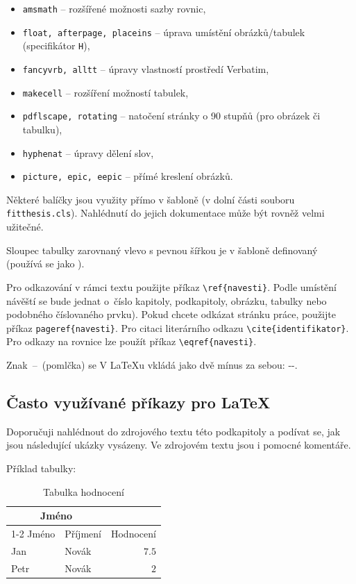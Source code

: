 \begin{itemize}
  \item \verb|amsmath| -- rozšířené možnosti sazby rovnic,
  \item \verb|float, afterpage, placeins| -- úprava umístění obrázků/tabulek (specifikátor \texttt{H}),
  \item \verb|fancyvrb, alltt| -- úpravy vlastností prostředí Verbatim, 
  \item \verb|makecell| -- rozšíření možností tabulek,
  \item \verb|pdflscape, rotating| -- natočení stránky o 90 stupňů (pro obrázek či tabulku),
  \item \verb|hyphenat| -- úpravy dělení slov,
  \item \verb|picture, epic, eepic| -- přímé kreslení obrázků.
\end{itemize}

Některé balíčky jsou využity přímo v šabloně (v dolní části souboru \texttt{fitthesis.cls}). Nahlédnutí do jejich dokumentace může být rovněž velmi užitečné.

Sloupec tabulky zarovnaný vlevo s pevnou šířkou je v šabloně definovaný  (používá se jako ).

Pro odkazování v rámci textu použijte příkaz \verb|\ref{navesti}|. Podle umístění návěští se bude jednat o~číslo kapitoly, podkapitoly, obrázku, tabulky nebo podobného číslovaného prvku). Pokud chcete odkázat stránku práce, použijte příkaz \verb|pageref{navesti}|. Pro citaci literárního odkazu \verb|\cite{identifikator}|. Pro odkazy na rovnice lze použít příkaz \verb|\eqref{navesti}|.

Znak \,--\, (pomlčka) se V \LaTeX u vkládá jako dvě mínus za sebou: -{}-.

\subsection*{Často využívané příkazy pro \LaTeX{}}
\label{sec:Fragments}

Doporučuji nahlédnout do zdrojového textu této podkapitoly a podívat se, jak jsou následující ukázky vysázeny. Ve zdrojovém textu jsou i pomocné komentáře.


Příklad tabulky:
\begin{table}[H]
	\vskip6pt
	\caption{Tabulka hodnocení} 
    \vskip6pt
	\centering
	\begin{tabular}{llr}
		\toprule
		\multicolumn{2}{c}{Jméno} \\
		\cmidrule(r){1-2}
		Jméno & Příjmení & Hodnocení \\
		\midrule
		Jan & Novák & $7.5$ \\
		Petr & Novák & $2$ \\
		\bottomrule
	\end{tabular}
	\label{tab:ExampleTable}
\end{table}

